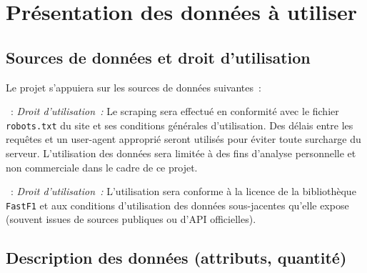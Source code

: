 \documentclass[11pt, a4paper]{article}
\begin{document}

\section{Présentation des données à utiliser}

\subsection{Sources de données et droit d’utilisation}

Le projet s'appuiera sur les sources de données suivantes~:

\begin{description}[style=standard, itemsep=0.5em, labelwidth=!, leftmargin=1.5em, font=\normalfont]
    \item[Site Web Officiel (\url{formula1.com})]~:
        \subitem \textit{Droit d'utilisation~:} Le scraping sera effectué en conformité avec le fichier \texttt{robots.txt} du site et ses conditions générales d'utilisation. Des délais entre les requêtes et un user-agent approprié seront utilisés pour éviter toute surcharge du serveur. L'utilisation des données sera limitée à des fins d'analyse personnelle et non commerciale dans le cadre de ce projet.

    \item[API FastF1 (Bibliothèque Python \texttt{FastF1})]~:
        \subitem \textit{Droit d'utilisation~:} L'utilisation sera conforme à la licence de la bibliothèque \texttt{FastF1} et aux conditions d'utilisation des données sous-jacentes qu'elle expose (souvent issues de sources publiques ou d'API officielles).
\end{description}

\subsection{Description des données (attributs, quantité)}
\end{document}
